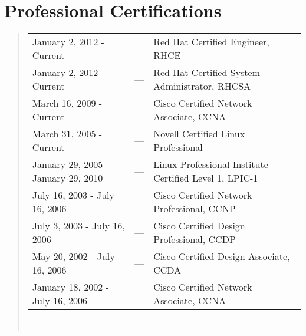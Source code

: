 \section*{Professional Certifications}
\begin{quote}
\begin{tabular}{l c l}
January 2, 2012 - Current & --- & Red Hat Certified Engineer, RHCE\\
January 2, 2012 - Current & --- & Red Hat Certified System Administrator, RHCSA\\
March 16, 2009 - Current & --- & Cisco Certified Network Associate, CCNA\\
March 31, 2005 - Current & --- & Novell Certified Linux Professional\\
January 29, 2005 - January 29, 2010 & --- & Linux Professional Institute Certified Level 1, LPIC-1\\
July 16, 2003 - July 16, 2006 & --- & Cisco Certified Network Professional, CCNP\\
July 3, 2003 - July 16, 2006 & --- & Cisco Certified Design Professional, CCDP\\
May 20, 2002 - July 16, 2006 & --- & Cisco Certified Design Associate, CCDA\\
January 18, 2002 - July 16, 2006 & --- & Cisco Certified Network Associate, CCNA\\
\end{tabular}\\
\end{quote}
